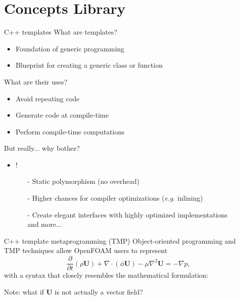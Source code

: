 \documentclass{beamer}
\begin{document}

\section{Concepts Library}

\begin{frame}{C++ templates}
	What are templates?
	\begin{itemize}
		\item Foundation of generic programming
		\item Blueprint for creating a generic class or function
	\end{itemize}
	
	What are their uses?
	\begin{itemize}
		\item Avoid repeating code
		\item Generate code at compile-time
		\item Perform compile-time computations
	\end{itemize}

	But really... why bother?
	\begin{itemize}
		\item {}!
		\begin{itemize}
			\item[-] Static polymorphism (no overhead)
			\item[-] Higher chances for compiler optimizations (\textit{e.g.} inlining)
			\item[-] Create elegant interfaces with highly optimized implementations\\
			\vspace{5pt}
			and more...
		\end{itemize}
	\end{itemize}
\end{frame}

\begin{frame}{C++ template metaprogramming (TMP)}
	Object-oriented programming and TMP techniques allow OpenFOAM users to represent
	\begin{equation}
		\frac{\partial}{\partial t}\left(\rho\mathbf{U}\right) + \nabla\cdot\left(\phi\mathbf{U}\right) - \mu\nabla^2\mathbf{U} = -\nabla p,
	\end{equation}
	with a syntax that closely resembles the mathematical formulation:
	
	Note: what if $\mathbf{U}$ is not actually a vector field?
\end{frame}
\end{document}
